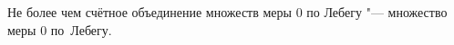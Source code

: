 
 	Не более чем счётное объединение множеств меры $0$ по Лебегу "--- множество меры $0$ по~Лебегу.
 
